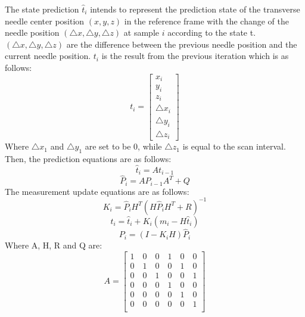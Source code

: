 \documentclass[journal,article,submit,moreauthors,pdftex]{Definitions/mdpi}
\begin{document}
The state prediction ${\hat{t}_i}$ intends to represent the prediction state of the transverse needle center position ${(x, y, z)}$ in the reference frame with the change of the needle position ${(\triangle x,\triangle y,\triangle z)}$ at sample ${i}$ according to the state t. ${(\triangle x,\triangle y,\triangle z)}$ are the difference between the previous needle position and the current needle position. ${t_i}$ is the result from the previous iteration which is as follows:
\begin{equation}
t_i =
\begin{bmatrix}
x_i\\
y_i\\
z_i\\
\triangle x_i\\
\triangle y_i\\
\triangle z_i
\end{bmatrix}
\end{equation}
Where ${\triangle x_1}$ and ${\triangle y_1}$ are set to be 0, while ${\triangle z_1}$ is equal to the scan interval.
Then, the prediction equations are as follows:
\begin{equation}
\hat{t}_i= At_{i-1}
\end{equation}
\begin{equation}
\hat{P}_i=AP_{i-1}A^T+Q
\end{equation}
The measurement update equations are as follows:
\begin{equation}
K_i=\hat{P}_iH^T(H\hat{P}_iH^T+R)^{-1}
\end{equation}
\begin{equation}
\label{eq:6}
t_i=\hat{t}_i+K_i(m_i-H\hat{t}_i)
\end{equation}
\begin{equation}
P_i=(I- K_iH)\hat{P}_i
\end{equation}
Where A, H, R and Q are:
\begin{equation}
A =
\begin{bmatrix}
1 \quad 0 \quad 0 \quad 1 \quad 0 \quad 0\\
0 \quad 1 \quad 0 \quad 0 \quad 1 \quad 0\\
0 \quad 0 \quad 1 \quad 0 \quad 0 \quad 1\\
0 \quad 0 \quad 0 \quad 1 \quad 0 \quad 0\\
0 \quad 0 \quad 0 \quad 0 \quad 1 \quad 0\\
0 \quad 0 \quad 0 \quad 0 \quad 0 \quad 1\\
\end{bmatrix}
\end{equation}
\end{document}
